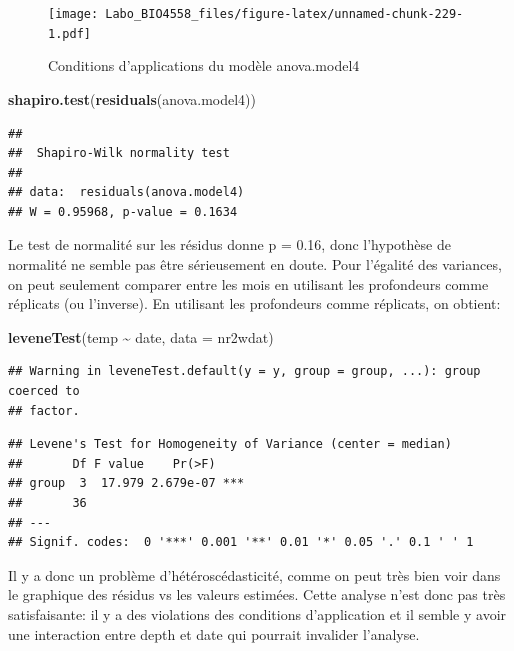 \documentclass[
  12pt,
]{book}
\newenvironment{Shaded}{\begin{snugshade}}{\end{snugshade}}
\newcommand{\DataTypeTok}[1]{\textcolor[rgb]{0.13,0.29,0.53}{#1}}
\newcommand{\KeywordTok}[1]{\textcolor[rgb]{0.13,0.29,0.53}{\textbf{#1}}}
\newcommand{\NormalTok}[1]{#1}
\newcommand{\OperatorTok}[1]{\textcolor[rgb]{0.81,0.36,0.00}{\textbf{#1}}}
\newcommand{\StringTok}[1]{\textcolor[rgb]{0.31,0.60,0.02}{#1}}
\begin{document}
\begin{figure}
\centering
\texttt{[image: Labo\_BIO4558\_files/figure-latex/unnamed-chunk-229-1.pdf]}
\caption{\label{fig:unnamed-chunk-229}Conditions d'applications du modèle anova.model4}
\end{figure}

\begin{Shaded}
\begin{Highlighting}[]
\KeywordTok{shapiro.test}\NormalTok{(}\KeywordTok{residuals}\NormalTok{(anova.model4))}
\end{Highlighting}
\end{Shaded}

\begin{verbatim}
## 
##  Shapiro-Wilk normality test
## 
## data:  residuals(anova.model4)
## W = 0.95968, p-value = 0.1634
\end{verbatim}

Le test de normalité sur les résidus donne p = 0.16, donc l'hypothèse de normalité ne semble pas être sérieusement en doute. Pour l'égalité des variances, on peut seulement comparer entre les mois en utilisant les profondeurs comme réplicats (ou l'inverse). En utilisant les profondeurs comme réplicats, on obtient:

\begin{Shaded}
\begin{Highlighting}[]
\KeywordTok{leveneTest}\NormalTok{(temp }\OperatorTok{\textasciitilde{}}\StringTok{ }\NormalTok{date, }\DataTypeTok{data =}\NormalTok{ nr2wdat)}
\end{Highlighting}
\end{Shaded}

\begin{verbatim}
## Warning in leveneTest.default(y = y, group = group, ...): group coerced to
## factor.
\end{verbatim}

\begin{verbatim}
## Levene's Test for Homogeneity of Variance (center = median)
##       Df F value    Pr(>F)    
## group  3  17.979 2.679e-07 ***
##       36                      
## ---
## Signif. codes:  0 '***' 0.001 '**' 0.01 '*' 0.05 '.' 0.1 ' ' 1
\end{verbatim}

Il y a donc un problème d'hétéroscédasticité, comme on peut très bien voir dans le graphique des résidus vs les valeurs estimées. Cette analyse n'est donc pas très satisfaisante: il y a des violations des conditions d'application et il semble y avoir une interaction entre depth et date qui pourrait invalider l'analyse.
\end{document}
